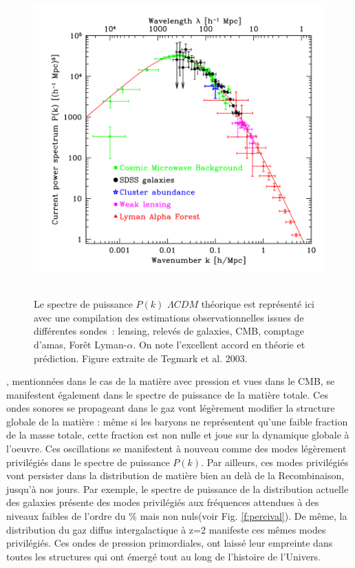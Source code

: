 \begin{figure}[htbp]
	\centering
		\includegraphics[height=12cm]{figs/pstegmark.png}
		\caption[Le spectre de puissance observé]{Le spectre de puissance $P(k)$ $\Lambda CDM$ théorique est représenté ici avec une compilation des estimations observationnelles issues de différentes sondes~: lensing, relevés de galaxies, CMB, comptage d'amas, Forêt Lyman-$\alpha$. On note l'excellent accord en théorie et prédiction.  Figure extraite de Tegmark et al. 2003. }
	\label{f:pktegmark}
\end{figure}


, mentionnées dans le cas de la matière avec pression et vues dans le CMB, se manifestent également dans le spectre de puissance de la matière totale. Ces ondes sonores se propageant dans le gaz vont légèrement modifier la structure globale de la matière : même si les baryons ne représentent qu'une faible fraction de la masse totale, cette fraction est non nulle et joue sur la dynamique globale à l'oeuvre. Ces oscillations se manifestent à nouveau comme des modes légèrement privilégiés dans le spectre de puissance $P(k)$. Par ailleurs, ces modes privilégiés vont persister dans la distribution de matière bien au delà de la Recombinaison, jusqu'à nos jours. Par exemple, le spectre de puissance de la distribution actuelle des galaxies  présente des modes privilégiés aux fréquences attendues à des niveaux faibles de l'ordre du $\%$ mais non nuls(voir Fig. \ref{f:percival}). De même, la distribution du gaz diffus intergalactique à z=2 manifeste ces mêmes modes privilégiés. Ces ondes de pression primordiales, ont laissé leur empreinte dans toutes les structures qui ont émergé tout au long de l'histoire de l'Univers.

